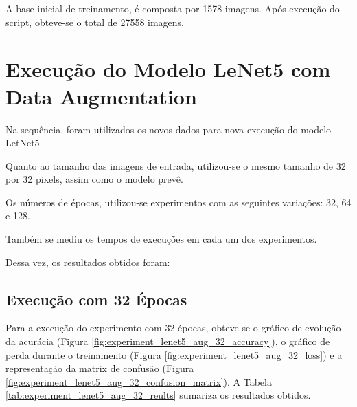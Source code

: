 \documentclass[12pt]{article}
\begin{document}
A base inicial de treinamento, é composta por 1578 imagens. Após execução do script, obteve-se o total de 27558 imagens.

\section{Execução do Modelo LeNet5 com Data Augmentation}

Na sequência, foram utilizados os novos dados para nova execução do modelo LetNet5.

Quanto ao tamanho das imagens de entrada, utilizou-se o mesmo tamanho de 32 por 32 pixels, assim como o modelo prevê.

Os números de épocas, utilizou-se experimentos com as seguintes variações: 32, 64 e 128.

Também se mediu os tempos de execuções em cada um dos experimentos.

Dessa vez, os resultados obtidos foram:

\newpage

\subsection{Execução com 32 Épocas}

Para a execução do experimento com 32 épocas, obteve-se o gráfico de evolução da acurácia (Figura \ref{fig:experiment_lenet5_aug_32_accuracy}), o gráfico de perda durante o treinamento (Figura \ref{fig:experiment_lenet5_aug_32_loss}) e a representação da matrix de confusão (Figura \ref{fig:experiment_lenet5_aug_32_confusion_matrix}). A Tabela \ref{tab:experiment_lenet5_aug_32_reults} sumariza os resultados obtidos.
\end{document}
